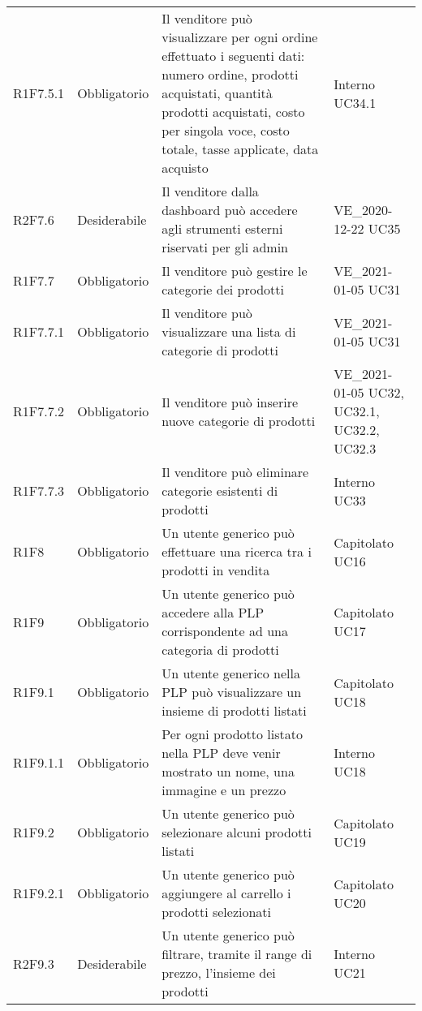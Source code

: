 {\begin{longtable}{C{2.5cm} C{2.8cm} C{6.7cm} C{2.5cm}}
R1F7.5.1 & Obbligatorio & Il venditore può visualizzare per ogni ordine effettuato i seguenti dati: numero ordine, prodotti acquistati, quantità prodotti acquistati, costo per singola voce, costo totale, tasse applicate, data acquisto & Interno \newline UC34.1\\
R2F7.6 & Desiderabile & Il venditore dalla dashboard può accedere agli strumenti esterni riservati per gli admin & VE\_2020-12-22 \newline UC35\\
R1F7.7 & Obbligatorio & Il venditore può gestire le categorie dei prodotti & VE\_2021-01-05 \newline UC31\\
R1F7.7.1 & Obbligatorio & Il venditore può visualizzare una lista di categorie di prodotti & VE\_2021-01-05 \newline UC31\\
R1F7.7.2 & Obbligatorio & Il venditore può inserire nuove categorie di prodotti & VE\_2021-01-05 \newline UC32, UC32.1, UC32.2, UC32.3\\
R1F7.7.3 & Obbligatorio & Il venditore può eliminare categorie esistenti di prodotti & Interno \newline UC33\\


R1F8 & Obbligatorio & Un utente generico può effettuare una ricerca tra i prodotti in vendita & Capitolato \newline UC16\\


R1F9 & Obbligatorio & Un utente generico può accedere alla PLP corrispondente ad una categoria di prodotti & Capitolato \newline UC17 \\
R1F9.1 & Obbligatorio & Un utente generico nella PLP può visualizzare un insieme di prodotti listati & Capitolato \newline UC18\\
R1F9.1.1 & Obbligatorio & Per ogni prodotto listato nella PLP deve venir mostrato un nome, una immagine e un prezzo & Interno \newline UC18\\
R1F9.2 & Obbligatorio & Un utente generico può selezionare alcuni prodotti listati & Capitolato \newline UC19\\
R1F9.2.1 & Obbligatorio & Un utente generico può aggiungere al carrello i prodotti selezionati & Capitolato \newline UC20\\
R2F9.3 & Desiderabile & Un utente generico può filtrare, tramite il range di prezzo, l'insieme dei prodotti & Interno \newline UC21\\


\end{longtable}}
